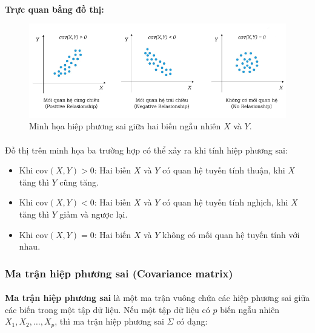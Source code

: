 \paragraph{}{\textbf{Trực quan bằng đồ thị:}}
\begin{figure}[H]
    \centering
    \includegraphics[width=\textwidth]{img/corvariance.png}
    \caption{Minh họa hiệp phương sai giữa hai biến ngẫu nhiên $X$ và $Y$.}
    \label{fig:covariance}
\end{figure}

\paragraph{}{Đồ thị trên minh họa ba trường hợp có thể xảy ra khi tính hiệp phương sai:}

\begin{itemize}
    \item Khi \(\text{cov}(X,Y) > 0\): Hai biến \(X\) và \(Y\) có quan hệ tuyến tính thuận, khi \(X\) tăng thì \(Y\) cũng tăng.
    \item Khi \(\text{cov}(X,Y) < 0\): Hai biến \(X\) và \(Y\) có quan hệ tuyến tính nghịch, khi \(X\) tăng thì \(Y\) giảm và ngược lại.
    \item Khi \(\text{cov}(X,Y) = 0\): Hai biến \(X\) và \(Y\) không có mối quan hệ tuyến tính với nhau.
\end{itemize}
\subsubsection{Ma trận hiệp phương sai (Covariance matrix)}

\paragraph{}{\textbf{Ma trận hiệp phương sai} là một ma trận vuông chứa các hiệp phương sai giữa các biến trong một tập dữ liệu. Nếu một tập dữ liệu có \( p \) biến ngẫu nhiên \( X_1, X_2, \dots, X_p \), thì ma trận hiệp phương sai \( \Sigma \) có dạng:}
 



